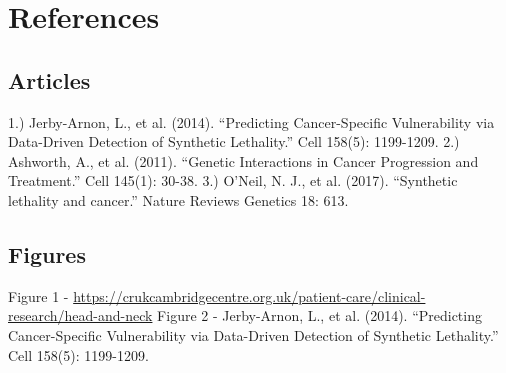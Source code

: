 \documentclass[]{article}
\begin{document}
\section{References}\label{references}

\subsection{Articles}\label{articles}

1.) Jerby-Arnon, L., et al. (2014). ``Predicting Cancer-Specific
Vulnerability via Data-Driven Detection of Synthetic Lethality.'' Cell
158(5): 1199-1209. 2.) Ashworth, A., et al. (2011). ``Genetic
Interactions in Cancer Progression and Treatment.'' Cell 145(1): 30-38.
3.) O'Neil, N. J., et al. (2017). ``Synthetic lethality and cancer.''
Nature Reviews Genetics 18: 613.

\subsection{Figures}\label{figures}

Figure 1 -
\url{https://crukcambridgecentre.org.uk/patient-care/clinical-research/head-and-neck}
Figure 2 - Jerby-Arnon, L., et al. (2014). ``Predicting Cancer-Specific
Vulnerability via Data-Driven Detection of Synthetic Lethality.'' Cell
158(5): 1199-1209.
\end{document}

